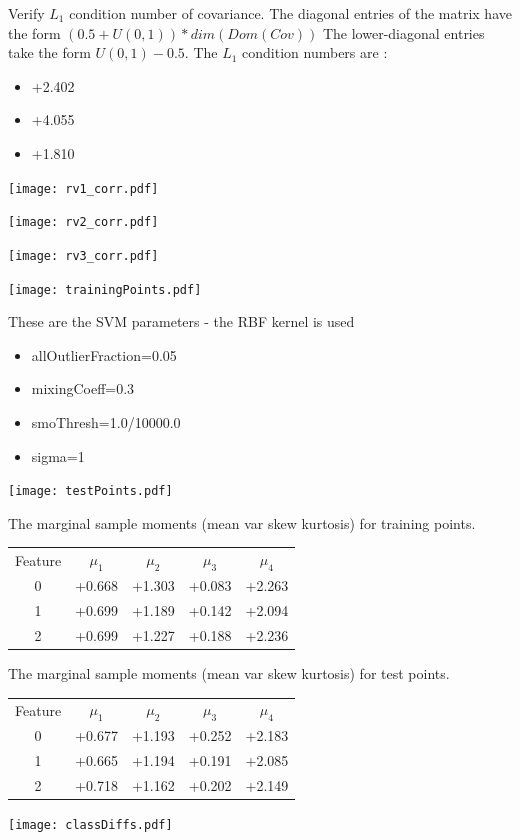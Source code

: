 \documentclass[12pt]{article}
\theoremstyle{definition}
\theoremstyle{remark}
\numberwithin{equation}{section}
\begin{document}
Verify $L_1$ condition number of covariance. The diagonal entries of the matrix have the form $(0.5 + U(0,1) )*dim(Dom(Cov))$
The lower-diagonal entries take the form $U(0,1) - 0.5$. 
The $L_1$ condition numbers are :
\begin{itemize}
\item +2.402
\item +4.055
\item +1.810
\end{itemize}
\texttt{[image: rv1\_corr.pdf]}

\texttt{[image: rv2\_corr.pdf]}

\texttt{[image: rv3\_corr.pdf]}

\texttt{[image: trainingPoints.pdf]}

These are the SVM parameters - the RBF kernel is used\begin{itemize}
\item allOutlierFraction=0.05
\item mixingCoeff=0.3
\item smoThresh=1.0/10000.0
\item sigma=1
\end{itemize}
\texttt{[image: testPoints.pdf]}

The marginal sample moments (mean var skew kurtosis) for training points.\newline
\begin{tabular}{ c |  c  c  c  c}
Feature & $\mu_1$ & $\mu_2$ & $\mu_3$ & $\mu_4$ \\
0 & +0.668 & +1.303 & +0.083& +2.263 \\
\hline
1 & +0.699 & +1.189 & +0.142& +2.094 \\
\hline
2 & +0.699 & +1.227 & +0.188& +2.236 \\
\hline
\end{tabular}
\newline
The marginal sample moments (mean var skew kurtosis) for test points.\newline
\begin{tabular}{ c | c  c  c  c}
Feature & $\mu_1$ & $\mu_2$ & $\mu_3$ & $\mu_4$ \\
0 & +0.677 & +1.193 & +0.252& +2.183\\
\hline
1 & +0.665 & +1.194 & +0.191& +2.085\\
\hline
2 & +0.718 & +1.162 & +0.202& +2.149\\
\hline
\end{tabular}\newline
\texttt{[image: classDiffs.pdf]}
\end{document}
